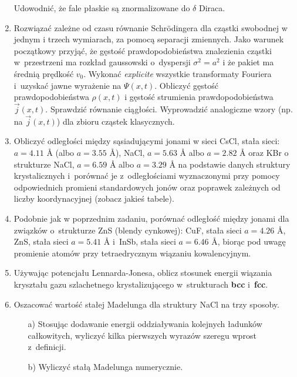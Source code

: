 \documentclass[a4paper,11pt]{article}
\begin{document}
\begin{enumerate}
  Udowodnić, że fale płaskie są znormalizowane do $\delta$ Diraca.

\item Rozwiązać zależne od czasu równanie Schr\"{o}dingera dla cząstki
  swobodnej w jednym i trzech wymiarach, za pomocą separacji
  zmiennych. Jako warunek początkowy przyjąć, że gęstość
  prawdopodobieństwa znalezienia cząstki w~przestrzeni ma rozkład
  gaussowski o~dyspersji $\sigma^{ 2 } = a^{ 2 }$ i że pakiet ma
  średnią prędkość $v_{ 0 }$. Wykonać \emph{explicite} wszystkie
  transformaty Fouriera i~uzyskać jawne wyrażenie na $\Psi( x, t )$.
  Obliczyć gęstość prawdopodobieństwa $\rho( x, t )$ i gęstość
  strumienia prawdopodobieństwa $\vec{ j }( x, t )$. Sprawdzić
  równanie ciągłości. Wyprowadzić analogiczne wzory (np. na
  $\vec{ j }( x, t )$) dla zbioru cząstek klasycznych.

\item Obliczyć odległości między sąsiadującymi jonami w sieci CsCl,
  stała sieci: $a = 4.11$ \AA{} (albo $a = 3.55$ \AA), NaCl,
  $a = 5.63$ \AA{} albo $a = 2.82$ \AA{} oraz KBr o strukturze NaCl,
  $a = 6.59$ \AA{} albo $a = 3.29$ \AA{} na podstawie danych struktury
  krystalicznych i~porównać je z~odległościami wyznaczonymi przy
  pomocy odpowiednich promieni standardowych jonów oraz poprawek
  zależnych od liczby koordynacyjnej (zobacz jakieś tabele).

\item Podobnie jak w poprzednim zadaniu, porównać odległość między
  jonami dla związków o~strukturze ZnS (blendy cynkowej): CuF, stała
  sieci $a = 4.26$ \AA, ZnS, stała sieci $a = 5.41$ \AA{} i~InSb, stała
  sieci $a = 6.46$ \AA, biorąc pod uwagę promienie atomów przy
  tetraedrycznym wiązaniu kowalencyjnym.

\item Używając potencjału Lennarda-Jonesa, oblicz stosunek energii
  wiązania kryształu gazu szlachetnego krystalizującego w~strukturach
  \textbf{bcc} i~\textbf{fcc}.

\item Oszacować wartość stałej Madelunga dla struktury NaCl na trzy
  sposoby.

  \begin{itemize}
  \item[a)] Stosując dodawanie energii oddziaływania kolejnych
    ładunków całkowitych, wyliczyć kilka pierwszych wyrazów szeregu
    wprost z~definicji.

  \item[b)] Wyliczyć stałą Madelunga numerycznie.


\end{itemize}
\end{enumerate}
\end{document}
